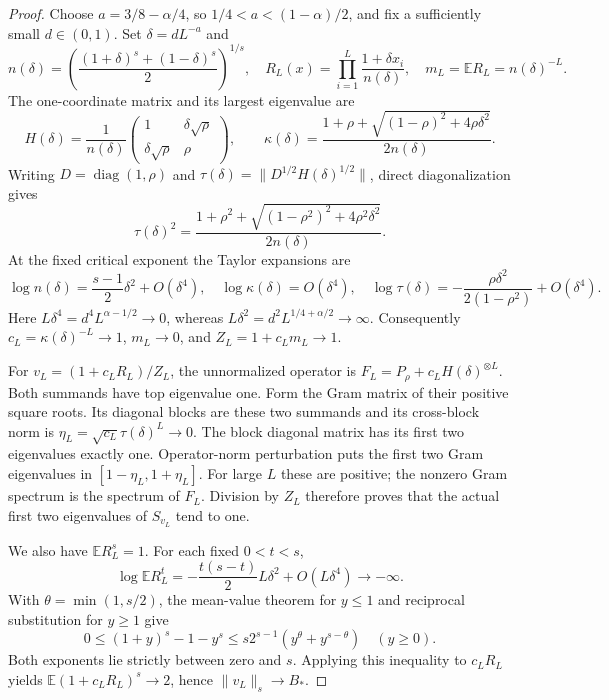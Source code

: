 \documentclass[11pt]{article}
\newcommand{\diag}{\operatorname{diag}}
\begin{document}
\begin{proof}
Choose $a=3/8-\alpha/4$, so $1/4<a<(1-\alpha)/2$, and fix a
sufficiently small $d\in(0,1)$. Set $\delta=dL^{-a}$ and
\[
 n(\delta)=\left(\frac{(1+\delta)^s+(1-\delta)^s}{2}\right)^{1/s},
 \quad R_L(x)=\prod_{i=1}^L\frac{1+\delta x_i}{n(\delta)},
 \quad m_L=\mathbb E R_L=n(\delta)^{-L}.
\]
The one-coordinate matrix and its largest eigenvalue are
\[
 H(\delta)=\frac1{n(\delta)}
 \begin{pmatrix}1&\delta\sqrt\rho\\\delta\sqrt\rho&\rho\end{pmatrix},
 \qquad
 \kappa(\delta)=\frac{1+\rho+
 \sqrt{(1-\rho)^2+4\rho\delta^2}}{2n(\delta)}.
\]
Writing $D=\diag(1,\rho)$ and
$\tau(\delta)=\|D^{1/2}H(\delta)^{1/2}\|$, direct diagonalization gives
\[
 \tau(\delta)^2=\frac{1+\rho^2+
 \sqrt{(1-\rho^2)^2+4\rho^2\delta^2}}{2n(\delta)}.
\]
At the fixed critical exponent the Taylor expansions are
\[
 \log n(\delta)=\frac{s-1}{2}\delta^2+O(\delta^4),\quad
 \log\kappa(\delta)=O(\delta^4),\quad
 \log\tau(\delta)=-\frac{\rho\delta^2}{2(1-\rho^2)}+O(\delta^4).
\]
Here $L\delta^4=d^4L^{\alpha-1/2}\to0$, whereas
$L\delta^2=d^2L^{1/4+\alpha/2}\to\infty$.
Consequently $c_L=\kappa(\delta)^{-L}\to1$, $m_L\to0$, and
$Z_L=1+c_Lm_L\to1$.

For $v_L=(1+c_LR_L)/Z_L$, the unnormalized operator is
$F_L=P_\rho+c_LH(\delta)^{\otimes L}$. Both summands have top
eigenvalue one. Form the Gram matrix of their positive square roots.
Its diagonal blocks are these two summands and its cross-block norm is
$\eta_L=\sqrt{c_L}\tau(\delta)^L\to0$. The block diagonal matrix has
its first two eigenvalues exactly one. Operator-norm perturbation puts
the first two Gram eigenvalues in $[1-\eta_L,1+\eta_L]$.
For large $L$ these are positive; the nonzero Gram spectrum is the spectrum
of $F_L$. Division by $Z_L$ therefore proves that the actual first two
eigenvalues of $S_{v_L}$ tend to one.

We also have $\mathbb E R_L^s=1$. For each fixed $0<t<s$,
\[
 \log\mathbb E R_L^t=-\frac{t(s-t)}2L\delta^2+O(L\delta^4)
 \longrightarrow-\infty.
\]
With $\theta=\min(1,s/2)$, the mean-value theorem for $y\leq1$ and
reciprocal substitution for $y\geq1$ give
\[
 0\leq(1+y)^s-1-y^s\leq
 s2^{s-1}(y^\theta+y^{s-\theta})\quad(y\geq0).
\]
Both exponents lie strictly between zero and $s$. Applying this inequality
to $c_LR_L$ yields $\mathbb E(1+c_LR_L)^s\to2$, hence
$\|v_L\|_s\to B_*$.


\end{proof}
\end{document}
